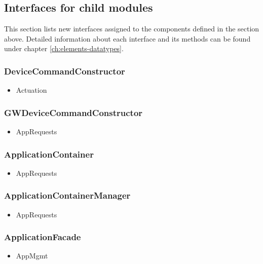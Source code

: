 \subsection{Interfaces for child modules}
    This section lists new interfaces assigned to the components defined
    in the section above. Detailed information about each interface and
    its methods can be found under chapter \ref{ch:elements-datatypes}. \\

    \subsubsection{DeviceCommandConstructor}
        \begin{itemize}
            \item Actuation
        \end{itemize}

    \subsubsection{GWDeviceCommandConstructor}
        \begin{itemize}
            \item AppRequests
        \end{itemize}

   \subsubsection{ApplicationContainer}
        \begin{itemize}
            \item AppRequests
        \end{itemize}

    \subsubsection{ApplicationContainerManager}
        \begin{itemize}
            \item AppRequests
        \end{itemize}

    \subsubsection{ApplicationFacade}
        \begin{itemize}
            \item AppMgmt
        \end{itemize}

